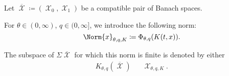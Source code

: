 \begin{definition}\label{def:k_functional_interpolation_space}
  Let \( \overline{\mscrX} \coloneqq ( \mscrX_0, \mscrX_1 ) \) be a compatible pair of Banach spaces.

  For \( \theta \in (0, \infty) \), \( q \in (0, \infty] \), we introduce the following norm:
  \begin{equation}\label{eq:def:k_functional_interpolation_space/norm}
    \Norm{x}_{\theta,q,K} \coloneqq \Phi_{\theta,q}(K(t, x)).
  \end{equation}

  The subspace of \( \Sigma\overline{\mscrX} \) for which this norm is finite is denoted by either
  \begin{align*}
    K_{\theta,q}(\overline{\mscrX})
    &&
    \mscrX_{\theta,q,K}.
  \end{align*}
\end{definition}

